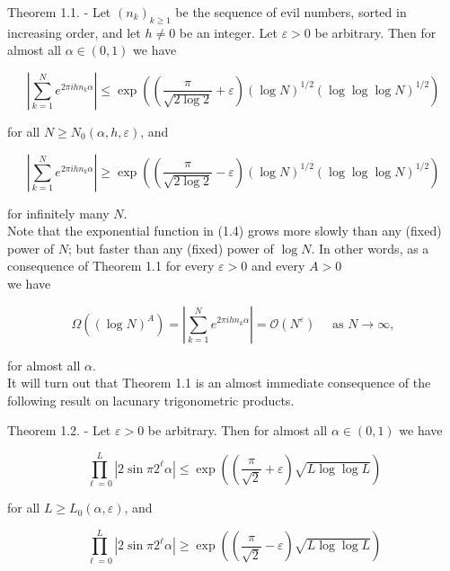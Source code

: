 \documentclass[10pt]{article}
\newcommand{\1}{\mathbf{1}}
\begin{document}
Theorem 1.1. - Let $\left(n_{k}\right)_{k \geqslant 1}$ be the sequence of evil numbers, sorted in increasing order, and let $h \neq 0$ be an integer. Let $\varepsilon>0$ be arbitrary. Then for almost all $\alpha \in(0,1)$ we have


\begin{equation*}
\left|\sum_{k=1}^{N} e^{2 \pi i h n_{k} \alpha}\right| \leqslant \exp \left(\left(\frac{\pi}{\sqrt{2\log 2}}+\varepsilon\right)(\log N)^{1 / 2}(\log \log \log N)^{1 / 2}\right) \tag{1.4}
\end{equation*}


for all $N \geqslant N_{0}(\alpha, h, \varepsilon)$, and


\begin{equation*}
\left|\sum_{k=1}^{N} e^{2 \pi i h n_{k} \alpha}\right| \geqslant \exp \left(\left(\frac{\pi}{\sqrt{2\log 2}}-\varepsilon\right)(\log N)^{1 / 2}(\log \log \log N)^{1 / 2}\right) \tag{1.5}
\end{equation*}


for infinitely many $N$.\\
Note that the exponential function in (1.4) grows more slowly than any (fixed) power of $N$; but faster than any (fixed) power of $\log N$. In other words, as a consequence of Theorem 1.1 for every $\varepsilon>0$ and every $A>0$\\
we have

$$
\Omega\left((\log N)^{A}\right)=\left|\sum_{k=1}^{N} e^{2 \pi i h n_{k} \alpha}\right|=\mathcal{O}\left(N^{\varepsilon}\right) \quad \text { as } N \rightarrow \infty,
$$

for almost all $\alpha$.\\
It will turn out that Theorem 1.1 is an almost immediate consequence of the following result on lacunary trigonometric products.

Theorem 1.2. - Let $\varepsilon>0$ be arbitrary. Then for almost all $\alpha \in(0,1)$ we have


\begin{equation*}
\prod_{\ell=0}^{L}\left|2 \sin \pi 2^{\ell} \alpha\right| \leqslant \exp \left(\left(\frac{\pi}{\sqrt{2}}+\varepsilon\right)\sqrt{L\log\log L}\right) \tag{1.6}
\end{equation*}


for all $L \geqslant L_{0}(\alpha, \varepsilon)$, and


\begin{equation*}
\prod_{\ell=0}^{L}\left|2 \sin \pi 2^{\ell} \alpha\right| \geqslant \exp \left(\left(\frac{\pi}{\sqrt{2}}-\varepsilon\right)\sqrt{L\log\log L}\right) \tag{1.7}
\end{equation*}
\end{document}
